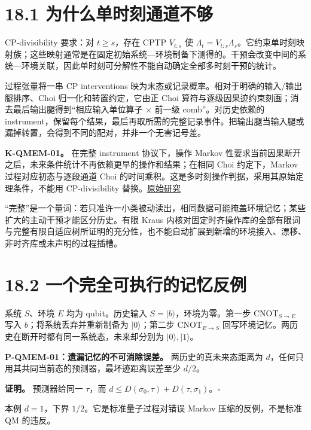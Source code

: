 \documentclass[
  11pt,
  oneside]{book}
\begin{document}
\section{18.1 为什么单时刻通道不够}

CP-divisibility 要求：对 \(t\ge s\)，存在 CPTP \(V_{t:s}\) 使
\(\Lambda_t=V_{t:s}\Lambda_s\)。它约束单时刻映射族；这些映射通常是在固定初始系统---环境制备下测得的。干预会改变中间的系统---环境关联，因此单时刻可分解性不能自动确定全部多时刻干预的统计。

过程张量将一串 CP interventions
映为末态或记录概率。相对于明确的输入/输出腿排序、Choi
归一化和转置约定，它由正 Choi
算符与逐级因果迹约束刻画；消去最后输出腿得到``相应输入单位算子 × 前一级
comb''。对历史依赖的
instrument，保留每个结果，最后再取所需的完整记录事件。把输出腿当输入腿或漏掉转置，会得到不同的配对，并非一个无害记号差。

\textbf{K-QMEM-01。} 在完整 instrument 协议下，操作 Markov
性要求当前因果断开之后，未来条件统计不再依赖更早的操作和结果；在相同
Choi 约定下，Markov 过程对应初态与逐段通道 Choi
的时间乘积。这是多时刻操作判据，采用其原始定理条件，不能用
CP-divisibility 替换。\href{https://arxiv.org/abs/1512.00589}{原始研究}

``完整''是一个量词：若只准许一小类被动读出，相同数据可能掩盖环境记忆；某些扩大的主动干预才能区分历史。有限
Kraus
内核对固定时齐操作库的全部有限词与完整有限自适应树所证明的充分性，也不能自动扩展到新增的环境接入、漂移、非时齐库或未声明的过程插槽。

\section{18.2 一个完全可执行的记忆反例}

系统 \(S\)、环境 \(E\) 均为 qubit。历史输入
\(S=|b\rangle\)，环境为零。第一步 \(\mathrm{CNOT}_{S\to E}\) 写入
\(b\)；将系统丢弃并重新制备为 \(|0\rangle\)；第二步
\(\mathrm{CNOT}_{E\to S}\)
回写环境记忆。两历史在断开时都有同一系统态，未来却分别为
\(|0\rangle,|1\rangle\)。

\protect\hypertarget{p-qmem-01}{}{}

\textbf{P-QMEM-01：遗漏记忆的不可消除误差。} 两历史的真未来态距离为
\(d\)，任何只用其共同当前态的预测器，最坏迹距离误差至少 \(d/2\)。

\textbf{证明。} 预测器给同一 \(\tau\)，而
\(d\le D(\sigma_0,\tau)+D(\tau,\sigma_1)\)。\(\square\)

本例 \(d=1\)，下界 \(1/2\)。它是标准量子过程对错误 Markov
压缩的反例，不是标准 QM 的违反。
\end{document}
